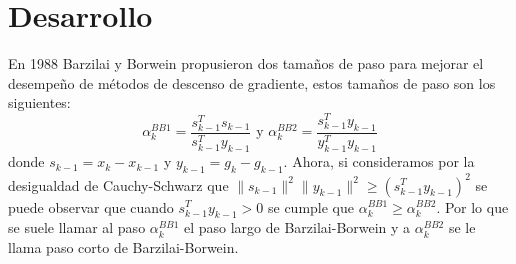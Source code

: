 \section*{Desarrollo}
En 1988 Barzilai y Borwein propusieron dos tamaños de paso para mejorar el desempeño de métodos de descenso de gradiente, estos tamaños de paso son los siguientes:
$$
\alpha^{BB1}_k = \frac{s^T_{k-1}s_{k-1}}{s^T_{k-1}y_{k-1}} \text{ y } \alpha_k^{BB2} = \frac{s_{k-1}^Ty_{k-1}}{y_{k-1}^Ty_{k-1}}
$$
donde $s_{k-1} = x_k - x_{k-1}$ y $y_{k-1} = g_k - g_{k-1}$. Ahora, si consideramos por la desigualdad de Cauchy-Schwarz que $\|s_{k-1}\|^2\|y_{k-1}\|^2 \geq (s_{k-1}^Ty_{k-1})^2$ se puede observar que cuando $s_{k-1}^Ty_{k-1}>0$ se cumple que $\alpha_k^{BB1} \geq \alpha_k^{BB2}$. Por lo que se suele llamar al paso $\alpha_k^{BB1}$ el paso largo de Barzilai-Borwein y a $\alpha_k^{BB2}$ se le llama paso corto de Barzilai-Borwein.
